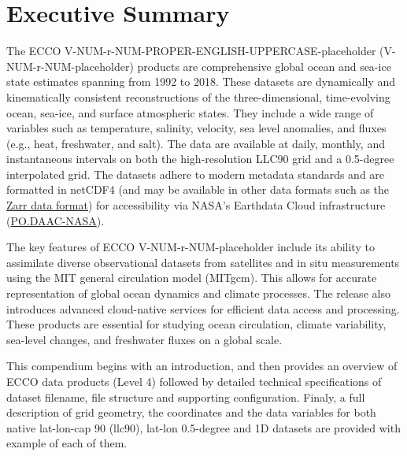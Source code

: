\pagebreak\section{Executive Summary}
\par \vspace{0.5cm}

The ECCO V-NUM-r-NUM-PROPER-ENGLISH-UPPERCASE-placeholder (V-NUM-r-NUM-placeholder) products are comprehensive global ocean and sea-ice state estimates spanning 
from 1992 to 2018. These datasets are dynamically and kinematically consistent reconstructions of the three-dimensional, 
time-evolving ocean, sea-ice, and surface atmospheric states. They include a wide range of variables such as temperature, 
salinity, velocity, sea level anomalies, and fluxes (e.g., heat, freshwater, and salt). The data are available at daily, 
monthly, and instantaneous intervals on both the high-resolution LLC90 grid and a 0.5-degree interpolated grid. The datasets 
adhere to modern metadata standards and are formatted in netCDF4 (and may be available in other data formats such as the
\href{https://en.wikipedia.org/wiki/Zarr_(data_format)}{Zarr data format}) for accessibility via NASA's 
Earthdata Cloud infrastructure (\href{https://podaac.jpl.nasa.gov/}{PO.DAAC-NASA}).

The key features of ECCO V-NUM-r-NUM-placeholder include its ability to assimilate diverse observational datasets from satellites 
and in situ measurements using the MIT general circulation model (MITgcm). This allows for accurate representation 
of global ocean dynamics and climate processes. The release also introduces advanced cloud-native services for efficient 
data access and processing. These products are essential for studying ocean circulation, climate variability, sea-level 
changes, and freshwater fluxes on a global scale.

This compendium begins with an introduction, and then provides an
overview of ECCO data products (Level 4) followed by detailed technical specifications of dataset filename, 
file structure and supporting configuration. Finaly, a full description of grid geometry, the coordinates and the 
data variables for both native lat-lon-cap 90 (llc90), lat-lon 0.5-degree and 1D datasets are provided with example of each of them.

